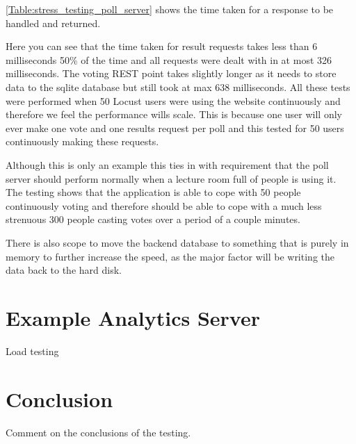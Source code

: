 \autoref{Table:stress_testing_poll_server} shows the time taken for a response to be handled and returned.

Here you can see that the time taken for result requests takes less than 6 milliseconds 50\% of the time and all requests were dealt with in at most 326 milliseconds. The voting REST point takes slightly longer as it needs to store data to the sqlite database but still took at max 638 milliseconds. All these tests were performed when 50 Locust users were using the website continuously and therefore we feel the performance wills scale. This is because one user will only ever make one vote and one results request per poll and this tested for 50 users continuously making these requests.

Although this is only an example this ties in with requirement  that the poll server should perform normally when a lecture room full of people is using it. The testing shows that the application is able to cope with 50 people continuously voting and therefore should be able to cope with a much less strenuous 300 people casting votes over a period of a couple minutes.

There is also scope to move the backend database to something that is purely in memory to further increase the speed, as the major factor will be writing the data back to the hard disk.

\section{Example Analytics Server}

Load testing

\section{Conclusion}

Comment on the conclusions of the testing.

